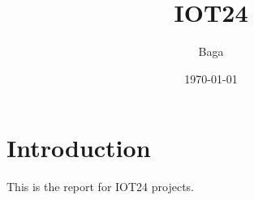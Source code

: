 \documentclass{article}
\title{IOT24}
\author{Baga}
\date{\today}
\begin{document}
\maketitle

\section{Introduction}
This is the report for IOT24 projects.
\end{document}
